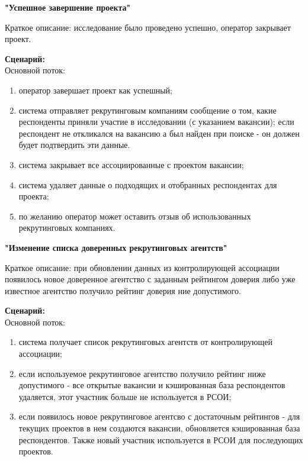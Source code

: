 \textbf{"Успешное завершение проекта"}

Краткое описание: исследование было проведено успешно, оператор закрывает проект.

\textbf{Сценарий:}\\
Основной поток:
\begin{enumerate}
\item оператор завершает проект как успешный;
\item система отправляет рекрутинговым компаниям сообщение о том, какие респонденты приняли участие в исследовании (с указанием вакансии); если респондент не откликался на вакансию а был найден при поиске - он должен будет подтвердить эти данные.
\item система закрывает все ассоциированные с проектом вакансии;
\item система удаляет данные о подходящих и отобранных респондентах для проекта;
\item по желанию оператор может оставить отзыв об использованных рекрутинговых компаниях.
\end{enumerate}

\textbf{"Изменение списка доверенных рекрутинговых агентств"}

Краткое описание: при обновлении данных из контролирующей ассоциации появилось новое доверенное агентство с заданным рейтингом доверия либо уже известное агентство получило рейтинг доверия ние допустимого.

\textbf{Сценарий:}\\
Основной поток:
\begin{enumerate}
\item система получает список рекрутинговых агентств от контролирующей ассоциации;
\item если используемое рекрутинговое агентство получило рейтинг ниже допустимого - все открытые вакансии и кэшированная база респондентов удаляется, этот участник больше не используется в РСОИ;
\item если появилось новое рекрутинговое агентсво с достаточным рейтингов - для текущих проектов в нем создаются вакансии, обновляется кэшированная база респондентов. Также новый участник используется в РСОИ для последующих проектов.
\end{enumerate}

